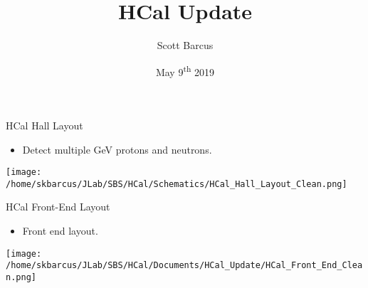 \documentclass[10pt]{beamer}
\title{HCal Update}
\subtitle{}
\date{May 9\textsuperscript{th} 2019}
\author{Scott Barcus}
\institute{Jefferson Lab}
\begin{document}
\maketitle

\begin{frame}{HCal Hall Layout}

	\begin{itemize}
		\item Detect multiple GeV protons and neutrons. 
	\end{itemize}

	\begin{center}
	\texttt{[image: /home/skbarcus/JLab/SBS/HCal/Schematics/HCal\_Hall\_Layout\_Clean.png]}
	\end{center}
\end{frame}

\begin{frame}{HCal Front-End Layout}

	\begin{itemize}
		\item Front end layout.
	\end{itemize}

	\vspace{-3mm}
	\begin{center}
	\texttt{[image: /home/skbarcus/JLab/SBS/HCal/Documents/HCal\_Update/HCal\_Front\_End\_Clean.png]}
	\end{center}
\end{frame}
\end{document}
